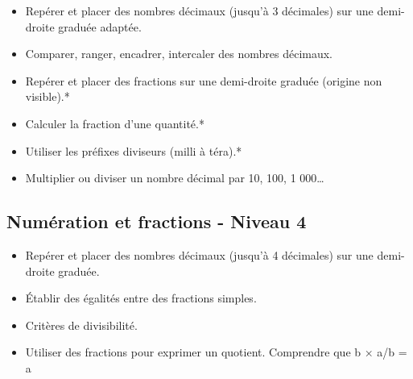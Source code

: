 \documentclass[a4paper,12pt,fleqn]{article}
\begin{document}
\begin{itemize}
	\item {}Repérer et placer des nombres décimaux (jusqu’à 3 décimales) sur une demi-droite graduée adaptée.
	\item {}Comparer, ranger, encadrer, intercaler des nombres décimaux.
	\item {}Repérer et placer des fractions sur une demi-droite graduée (origine non visible).*
	\item {}Calculer la fraction d’une quantité.*
	\item {}Utiliser les préfixes diviseurs (milli à téra).*
	\item {}Multiplier ou diviser un nombre décimal par 10, 100, 1 000…
\end{itemize}

\subsection*{Numération et fractions - Niveau 4}

\begin{itemize}
	\item {}Repérer et placer des nombres décimaux (jusqu’à 4 décimales) sur une demi-droite graduée.
	\item {}Établir des égalités entre des fractions simples.
	\item {}Critères de divisibilité.
	\item {}Utiliser des fractions pour exprimer un quotient. Comprendre que b × a/b = a
\end{itemize}

	
\end{document}
